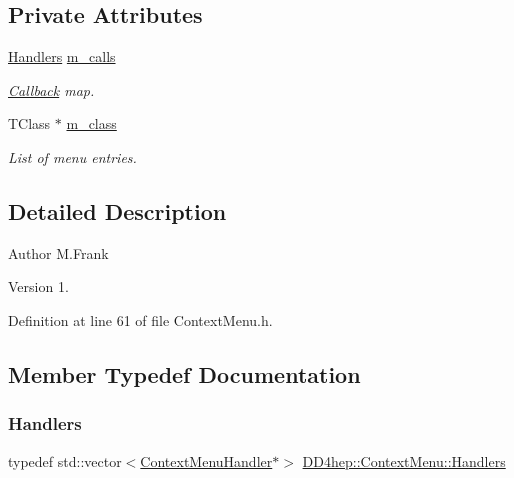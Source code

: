 \subsection*{Private Attributes}
\begin{DoxyCompactItemize}
\item 
\hyperlink{class_d_d4hep_1_1_context_menu_adafcfb2730659701df2a5364333ed386}{Handlers} \hyperlink{class_d_d4hep_1_1_context_menu_a4434fe38593c7eb73a8543cf1f8258ed}{m\+\_\+calls}
\begin{DoxyCompactList}\small\item\em \hyperlink{class_d_d4hep_1_1_callback}{Callback} map. \end{DoxyCompactList}\item 
T\+Class $\ast$ \hyperlink{class_d_d4hep_1_1_context_menu_ad9be22966c34ce07b6e83b2195bddad1}{m\+\_\+class}
\begin{DoxyCompactList}\small\item\em List of menu entries. \end{DoxyCompactList}\end{DoxyCompactItemize}


\subsection{Detailed Description}
\begin{DoxyAuthor}{Author}
M.\+Frank 
\end{DoxyAuthor}
\begin{DoxyVersion}{Version}
1. 
\end{DoxyVersion}


Definition at line 61 of file Context\+Menu.\+h.



\subsection{Member Typedef Documentation}
\hypertarget{class_d_d4hep_1_1_context_menu_adafcfb2730659701df2a5364333ed386}{}\label{class_d_d4hep_1_1_context_menu_adafcfb2730659701df2a5364333ed386} 
\subsubsection{\texorpdfstring{Handlers}{Handlers}}
{\footnotesize\ttfamily typedef std\+::vector$<$\hyperlink{class_d_d4hep_1_1_context_menu_handler}{Context\+Menu\+Handler}$\ast$$>$ \hyperlink{class_d_d4hep_1_1_context_menu_adafcfb2730659701df2a5364333ed386}{D\+D4hep\+::\+Context\+Menu\+::\+Handlers}\hspace{0.3cm}{\ttfamily [private]}}



